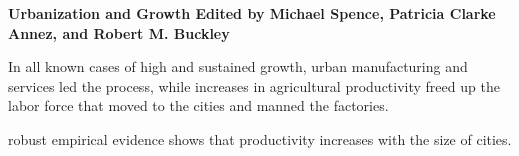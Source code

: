  \vspace{1cm}
\textbf{Urbanization and Growth Edited by Michael Spence, Patricia Clarke Annez, and Robert M. Buckley}

 In all known cases of high and sustained growth, urban manufacturing and services led the process, while increases in agricultural productivity freed up the labor force that moved to the cities and manned the factories. 

 robust empirical evidence shows that productivity increases with the size of cities. 


